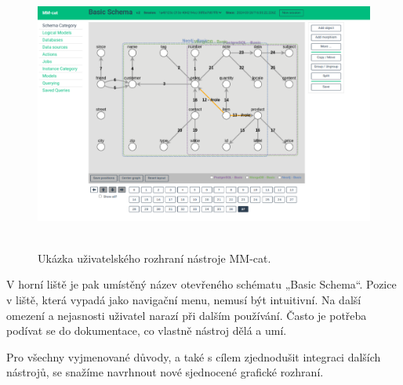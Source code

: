 \begin{figure}[htb]
  \centering
  \includegraphics[height=90mm]{../img/mm-cat}
  \caption{Ukázka uživatelského rozhraní nástroje MM-cat.}
  \label{obr01:mm-cat}
\end{figure}

V horní liště je pak umístěný název otevřeného schématu „Basic Schema“. Pozice v liště, která vypadá jako navigační menu, nemusí být intuitivní. Na další omezení a nejasnosti uživatel narazí při dalším používání. Často je potřeba podívat se do dokumentace, co vlastně nástroj dělá a umí.

Pro všechny vyjmenované důvody, a také s cílem zjednodušit integraci dalších nástrojů, se snažíme navrhnout nové sjednocené grafické rozhraní.
